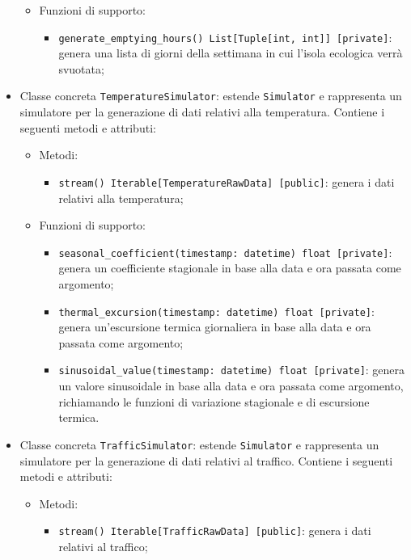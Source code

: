 \begin{itemize}
\begin{itemize}
\begin{itemize}
        \end{itemize}
        \item Funzioni di supporto:
        \begin{itemize}
            \item \texttt{generate\_emptying\_hours() List[Tuple[int, int]] [private]}: genera una lista di giorni della settimana in cui l'isola ecologica verrà svuotata;
        \end{itemize}
    \end{itemize}
    \item Classe concreta \texttt{TemperatureSimulator}: estende \texttt{Simulator} e rappresenta un simulatore per la generazione di dati relativi alla temperatura. Contiene i seguenti metodi e attributi:
    \begin{itemize}
        \item Metodi:
        \begin{itemize}
            \item \texttt{stream() Iterable[TemperatureRawData] [public]}: genera i dati relativi alla temperatura;
        \end{itemize}
        \item Funzioni di supporto:
        \begin{itemize}
            \item \texttt{seasonal\_coefficient(timestamp: datetime) float [private]}: genera un coefficiente stagionale in base alla data e ora passata come argomento;
            \item \texttt{thermal\_excursion(timestamp: datetime) float [private]}: genera un'escursione termica giornaliera in base alla data e ora passata come argomento;
            \item \texttt{sinusoidal\_value(timestamp: datetime) float [private]}: genera un valore sinusoidale in base alla data e ora passata come argomento, richiamando le funzioni di variazione stagionale e di escursione termica.
        \end{itemize}
    \end{itemize}
    \item Classe concreta \texttt{TrafficSimulator}: estende \texttt{Simulator} e rappresenta un simulatore per la generazione di dati relativi al traffico. Contiene i seguenti metodi e attributi:
    \begin{itemize}
        \item Metodi:
        \begin{itemize}
            \item \texttt{stream() Iterable[TrafficRawData] [public]}: genera i dati relativi al traffico;

\end{itemize}
\end{itemize}
\end{itemize}

